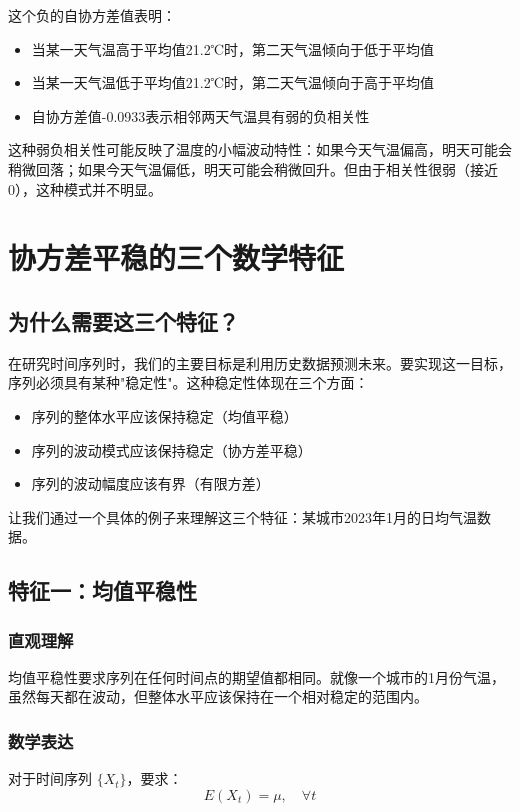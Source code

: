这个负的自协方差值表明：
\begin{itemize}
    \item 当某一天气温高于平均值21.2℃时，第二天气温倾向于低于平均值
    \item 当某一天气温低于平均值21.2℃时，第二天气温倾向于高于平均值
    \item 自协方差值-0.0933表示相邻两天气温具有弱的负相关性
\end{itemize}
这种弱负相关性可能反映了温度的小幅波动特性：如果今天气温偏高，明天可能会稍微回落；如果今天气温偏低，明天可能会稍微回升。但由于相关性很弱（接近0），这种模式并不明显。



\section{协方差平稳的三个数学特征}

\subsection{为什么需要这三个特征？}
在研究时间序列时，我们的主要目标是利用历史数据预测未来。要实现这一目标，序列必须具有某种"稳定性"。这种稳定性体现在三个方面：
\begin{itemize}
    \item 序列的整体水平应该保持稳定（均值平稳）
    \item 序列的波动模式应该保持稳定（协方差平稳）
    \item 序列的波动幅度应该有界（有限方差）
\end{itemize}

让我们通过一个具体的例子来理解这三个特征：某城市2023年1月的日均气温数据。

\subsection{特征一：均值平稳性}
\subsubsection{直观理解}
均值平稳性要求序列在任何时间点的期望值都相同。就像一个城市的1月份气温，虽然每天都在波动，但整体水平应该保持在一个相对稳定的范围内。

\subsubsection{数学表达}
对于时间序列 $\{X_t\}$，要求：
$$E(X_t) = \mu, \quad \forall t$$

